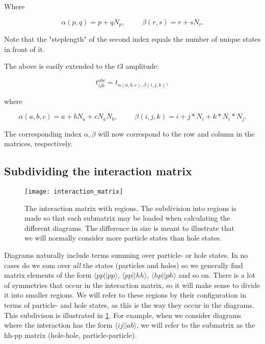 Where 

\begin{equation}
\alpha(p,q) = p + qN_p, \hspace{1cm}
\beta(r,s) = r + sN_r.
\label{eqn:t2mapping2}
\end{equation}

Note that the "steplength" of the second index equals the number of unique states in front of it. 

The above is easily extended to the $t3$ amplitude:

\begin{equation}
t^{abc}_{ijk} = t_{\alpha(a,b,c), \beta(i,j,k)},
\label{eqn:t3mapping}
\end{equation}

where 

\begin{equation}
\alpha(a,b,c) = a + bN_a + cN_aN_b,
\hspace{1cm}
\beta(i,j,k) = i + j*N_i + k*N_i*N_j.
\label{eqn:t3mapping2}
\end{equation}

The corresponding index $\alpha,\beta$ will now correspond to the row and column in the matrices, respectively. 

\subsection{Subdividing the interaction matrix}


\begin{figure}[p]
    \centering
    \texttt{[image: interaction\_matrix]}
    \caption{The interaction matrix with regions. The subdivision into regions is made so that each submatrix may be loaded when calculating the different diagrams. The difference in size is meant to illustrate that we will normally consider more particle states than hole states.}
    \label{fig:interaction_matrix}
\end{figure}


Diagrams naturally include terms summing over particle- or hole states. In no cases do we sum over \emph{all} the states (particles and holes) so we generally find matrix elements of the form $\langle pp \vert \vert pp \rangle $, $\langle pp \vert \vert hh \rangle $, $\langle hp \vert \vert ph \rangle $ and so on.  There is a lot of symmetries that occur in the interaction matrix, so it will make sense to divide it into smaller regions. We will refer to these regions by their configuration in terms of particle- and hole states, as this is the way they occur in the diagrams. This subdivison is illustrated in \ref{fig:interaction_matrix}. For example, when we consider diagrams where the interaction has the form $\langle i j \vert \vert a b\rangle$, we will refer to the submatrix as the hh-pp matrix (hole-hole, particle-particle).

